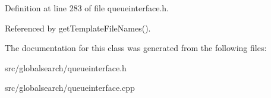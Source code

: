 Definition at line 283 of file queueinterface.\-h.



Referenced by get\-Template\-File\-Names().



The documentation for this class was generated from the following files\-:\begin{DoxyCompactItemize}
\item 
src/globalsearch/queueinterface.\-h\item 
src/globalsearch/queueinterface.\-cpp\end{DoxyCompactItemize}
